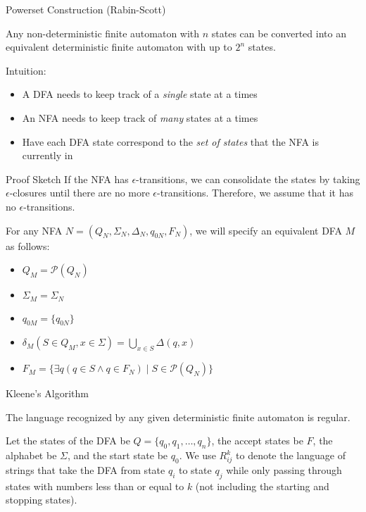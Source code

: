 \documentclass{beamer}
\begin{document}
\begin{frame}{Powerset Construction (Rabin-Scott)}
\begin{theorem}
Any non-deterministic finite automaton with $n$ states can be converted into an equivalent deterministic finite automaton with up to $2^n$ states. 
\end{theorem}
Intuition:
\begin{itemize}
\item A DFA needs to keep track of a \textit{single} state at a times
\item An NFA needs to keep track of \textit{many} states at a times
\item Have each DFA state correspond to the \textit{set of states} that the NFA is currently in
\end{itemize}
\end{frame}

\begin{frame}{Proof Sketch}
If the NFA has $\epsilon$-transitions, we can consolidate the states by taking $\epsilon$-closures until there are no more $\epsilon$-transitions.  Therefore, we assume that it has no $\epsilon$-transitions.

For any NFA $N = (Q_N, \Sigma_N, \Delta_N, q_{0N}, F_N)$, we will specify an equivalent DFA $M$ as follows:
\begin{itemize}
\item $Q_M = \mathcal{P}(Q_N)$
\item $\Sigma_M = \Sigma_N$
\item $q_{0M} = \{q_{0N}\}$
\item $\delta_M(S \in Q_M, x \in \Sigma) = \bigcup\limits_{x \in S} \Delta (q, x)$
\item $F_M = \{ \exists q (q \in S \wedge q \in F_N) \mid S \in \mathcal{P}(Q_N)\}$
\end{itemize}
\end{frame}

\begin{frame}{Kleene's Algorithm}
\begin{theorem}
The language recognized by any given deterministic finite automaton is regular.
\end{theorem}

Let the states of the DFA be $Q=\{q_0,q_1,\ldots,q_n\}$, the accept states be $F$, the alphabet be $\Sigma$, and the start state be $q_0$.  We use $R^k_{ij}$ to denote the language of strings that take the DFA from state $q_i$ to state $q_j$ while only passing through states with numbers less than or equal to $k$ (not including the starting and stopping states). 
\end{frame}
\end{document}
